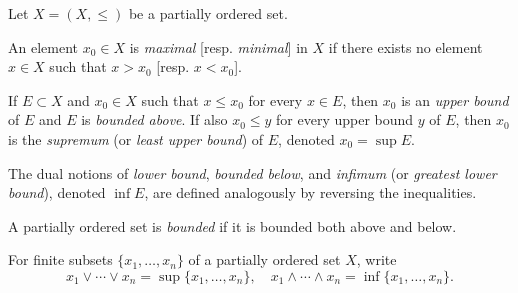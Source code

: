 Let $X = (X, \leq)$ be a partially ordered set.

An element $x_0 \in X$ is \textit{maximal} [resp. \textit{minimal}] in $X$ if there exists no element $x \in X$ such that $x > x_0$ [resp. $x < x_0$].

If $E \subset X$ and $x_0 \in X$ such that $x \leq x_0$ for every $x \in E$, then $x_0$ is an \textit{upper bound} of $E$ and $E$ is \textit{bounded above}. If also $x_0 \leq y$ for every upper bound $y$ of $E$, then $x_0$ is the \textit{supremum} (or \textit{least upper bound}) of $E$, denoted $x_0 = \sup E$.

The dual notions of \textit{lower bound}, \textit{bounded below}, and \textit{infimum} (or \textit{greatest lower bound}), denoted $\inf E$, are defined analogously by reversing the inequalities.

A partially ordered set is \textit{bounded} if it is bounded both above and below.

For finite subsets $\{x_1, \ldots, x_n\}$ of a partially ordered set $X$, write
$$x_1 \vee \cdots \vee x_n = \sup\{x_1, \ldots, x_n\}, \quad x_1 \wedge \cdots \wedge x_n = \inf\{x_1, \ldots, x_n\}.$$
